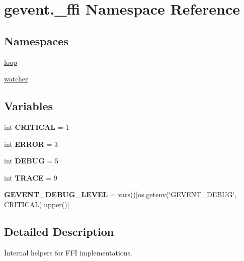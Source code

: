 \hypertarget{namespacegevent_1_1__ffi}{}\section{gevent.\+\_\+ffi Namespace Reference}
\label{namespacegevent_1_1__ffi}
\subsection*{Namespaces}
\begin{DoxyCompactItemize}
\item 
 \hyperlink{namespacegevent_1_1__ffi_1_1loop}{loop}
\item 
 \hyperlink{namespacegevent_1_1__ffi_1_1watcher}{watcher}
\end{DoxyCompactItemize}
\subsection*{Variables}
\begin{DoxyCompactItemize}
\item 
\mbox{\label{namespacegevent_1_1__ffi_af2f825ae4b5db8f3f8ba1a9dcce3941b}} 
int {\bfseries C\+R\+I\+T\+I\+C\+AL} = 1
\item 
\mbox{\label{namespacegevent_1_1__ffi_a76eea0b2e154311e0e6b7bb1d72cfb94}} 
int {\bfseries E\+R\+R\+OR} = 3
\item 
\mbox{\label{namespacegevent_1_1__ffi_ae4ebfce3748be856cb70ac754ba9b913}} 
int {\bfseries D\+E\+B\+UG} = 5
\item 
\mbox{\label{namespacegevent_1_1__ffi_a5d93aa95ea944a96169fe611f36e645b}} 
int {\bfseries T\+R\+A\+CE} = 9
\item 
\mbox{\label{namespacegevent_1_1__ffi_a22327e0424a1a5a637a3a00afb1869d3}} 
{\bfseries G\+E\+V\+E\+N\+T\+\_\+\+D\+E\+B\+U\+G\+\_\+\+L\+E\+V\+EL} = vars()\mbox{[}os.\+getenv(\char`\"{}G\+E\+V\+E\+N\+T\+\_\+\+D\+E\+B\+UG\char`\"{}, \textquotesingle{}C\+R\+I\+T\+I\+C\+AL\textquotesingle{}).upper()\mbox{]}
\end{DoxyCompactItemize}


\subsection{Detailed Description}
\begin{DoxyVerb}Internal helpers for FFI implementations.
\end{DoxyVerb}
 